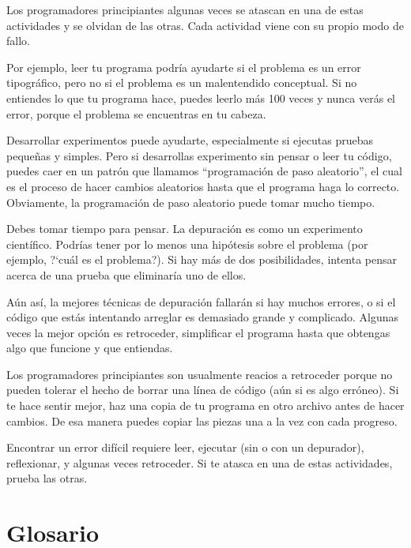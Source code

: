 Los programadores principiantes algunas veces se atascan en una de
estas actividades y se olvidan de las otras. Cada actividad viene
con su propio modo de fallo.

Por ejemplo, leer tu programa podría ayudarte si el problema es
un error tipográfico, pero no si el problema es un malentendido 
conceptual. Si no entiendes lo que tu programa hace, puedes leerlo
más 100 veces y nunca verás el error, porque el problema se encuentras en
tu cabeza.


Desarrollar experimentos puede ayudarte, especialmente si ejecutas
pruebas pequeñas y simples. Pero si desarrollas experimento sin pensar 
o leer tu código, puedes caer en un patrón que llamamos ``programación de 
paso aleatorio'', el cual es el proceso de hacer cambios aleatorios hasta
que el programa haga lo correcto. Obviamente, la programación de paso aleatorio
puede tomar mucho tiempo.

Debes tomar tiempo para pensar. La depuración es como un experimento científico.
Podrías tener por lo menos una hipótesis sobre el problema (por ejemplo, 
?`cuál es el problema?). Si hay más de dos posibilidades, intenta pensar
acerca de una prueba que eliminaría uno de ellos.

Aún así, la mejores técnicas de depuración fallarán si hay muchos errores,
o si el código que estás intentando arreglar es demasiado grande y 
complicado. Algunas veces la mejor opción es retroceder, simplificar el
programa hasta que obtengas algo que funcione y que entiendas.

Los programadores principiantes son usualmente reacios a retroceder
porque no pueden tolerar el hecho de borrar una línea de código 
(aún si es algo erróneo). Si te hace sentir mejor, haz una copia de
tu programa en otro archivo antes de hacer cambios. De esa manera
puedes copiar las piezas una a la vez con cada progreso.

Encontrar un error difícil requiere leer, ejecutar (sin o con 
un depurador), reflexionar, y algunas veces retroceder. Si te atasca
en una de estas actividades, prueba las otras. 


\section{Glosario}


